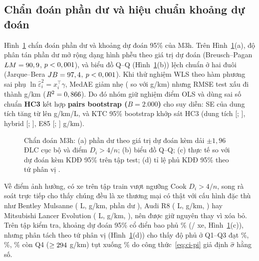 \subsection{Chẩn đoán phần dư và hiệu chuẩn khoảng dự đoán}
Hình~\ref{fig:resid} chẩn đoán phần dư và khoảng dự đoán 95\% của M3h. Trên Hình~\ref{fig:resid}(a), độ phân tán phần dư mở rộng dạng hình phễu theo giá trị dự đoán (Breusch--Pagan $LM = 90,9$, $p < 0,001$), và biểu đồ Q--Q (Hình~\ref{fig:resid}(b)) lệch chuẩn ở hai đuôi (Jarque--Bera $JB = 97,4$, $p < 0,001$). Khi thử nghiệm WLS theo hàm phương sai phụ $\ln \hat\varepsilon_i^2 = x_i^\top \gamma$, MedAE giảm nhẹ (\wlsMedae{} so với \medaeThreeH{} g/km) nhưng RMSE test xấu đi thành \wlsRmse{} g/km ($R^2 = 0,866$). Do đó nhóm giữ nghiệm điểm OLS và dùng sai số chuẩn \textbf{HC3} kết hợp \textbf{pairs bootstrap ($B = 2.000$)} cho suy diễn: SE của dung tích tăng từ \seEngineOls{} lên \seEngineHc{} g/km/L, và KTC 95\% bootstrap khớp sát HC3 (dung tích [\bootEngLo; \bootEngHi], hybrid [\bootHybridLo; \bootHybridHi], E85 [\bootEEightyFiveLo; \bootEEightyFiveHi] g/km).

\begin{figure}[htbp]
  \centering
  
  \caption{Chẩn đoán M3h: (a) phần dư theo giá trị dự đoán kèm dải $\pm 1{,}96$ ĐLC cục bộ và điểm $D_i > 4/n$; (b) biểu đồ Q--Q; (c) thực tế so với dự đoán kèm KDĐ 95\% trên tập test; (d) tỉ lệ phủ KDĐ 95\% theo tứ phân vị \COtwo{}.}
  \label{fig:resid}
\end{figure}

Về điểm ảnh hưởng, có \nCook{} xe trên tập train vượt ngưỡng Cook $D_i > 4/n$, song rà soát trực tiếp cho thấy chúng đều là xe thương mại có thật với cấu hình đặc thù như Bentley Mulsanne (\cookBentleyEng{} L, \cookBentleyCo{} g/km, phần dư \cookBentleyRes{}), Audi R8 (\cookAudiEng{} L, \cookAudiCo{} g/km, \cookAudiRes{}) hay Mitsubishi Lancer Evolution (\cookLancerEng{} L, \cookLancerCo{} g/km, \cookLancerRes{}), nên được giữ nguyên thay vì xóa bỏ. Trên tập kiểm tra, khoảng dự đoán 95\% cổ điển bao phủ \piCover\% (\piInCount/\nTest{} xe, Hình~\ref{fig:resid}(c)), nhưng phân tách theo tứ phân vị (Hình~\ref{fig:resid}(d)) cho thấy độ phủ ở Q1--Q3 đạt \piCoverQOne\%, \piCoverQTwo\%, \piCoverQThree\% còn Q4 ($\ge 294$ g/km) tụt xuống \piCoverQFour\% do công thức~\eqref{eq:ci-pi} giả định $\hat\sigma$ hằng số.

